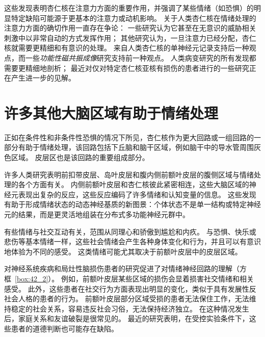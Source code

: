 这些发现表明杏仁核在注意力方面的重要作用，并强调了某些情绪（如恐惧）的明显特定缺陷可能源于更基本的注意力或动机影响。
关于人类杏仁核在情绪处理的注意力方面的确切作用一直存在争论：
一些研究认为它甚至在无意识的威胁相关刺激中以非常自动的方式发挥作用；
其他研究认为，一旦注意力已经分配，杏仁核就需要更精细和有意识的处理。
来自人类杏仁核的单神经元记录支持后一种观点，而一些\textit{功能性磁共振成像}研究支持前一种观点。
人类病变研究的所有发现都需要更精细地剖析；
最近对仅对特定杏仁核亚核有损伤的患者进行的一些研究正在产生进一步的见解。



\section{许多其他大脑区域有助于情绪处理}

正如在条件性和非条件性恐惧的情况下所见，杏仁核作为更大回路或一组回路的一部分有助于情绪处理，该回路包括下丘脑和脑干区域，例如脑干中的导水管周围灰色区域。
皮层区也是该回路的重要组成部分。


许多人类研究表明前扣带皮层、岛叶皮层和腹内侧前额叶皮层的腹侧区域与情绪处理的各个方面有关。
内侧前额叶皮层和杏仁核彼此紧密相连，这些大脑区域的神经元表现出复杂的反应，这些反应编码了许多情绪和认知变量的信息。
这些发现有助于形成情绪状态的动态神经基质的新图景：个体状态不是单一结构或特定神经元的结果，而是更灵活地组装在分布式多功能神经元群中。


有些情绪与社交互动有关，范围从同理心和骄傲到尴尬和内疚。
与恐惧、快乐或悲伤等基本情绪一样，这些社会情绪会产生各种身体变化和行为，并且可以有意识地体验为不同的感受。
这类情绪可能尤其取决于前额叶皮层中的皮层区域。


对神经系统疾病和局灶性脑损伤患者的研究促进了对情绪神经回路的理解（方框~\ref{box:42_2}）。
例如，前额叶皮层某些区域的损伤会显着损害社交情绪和相关感受。
此外，这些患者在社交行为方面表现出明显的变化，类似于具有发展性反社会人格的患者的行为。
前额叶皮层部分区域受损的患者无法保住工作，无法维持稳定的社会关系，容易违反社会习俗，无法保持经济独立。
在这种情况发生后，家庭关系和友谊破裂是很常见的。
最近的研究表明，在受控实验条件下，这些患者的道德判断也可能存在缺陷。



